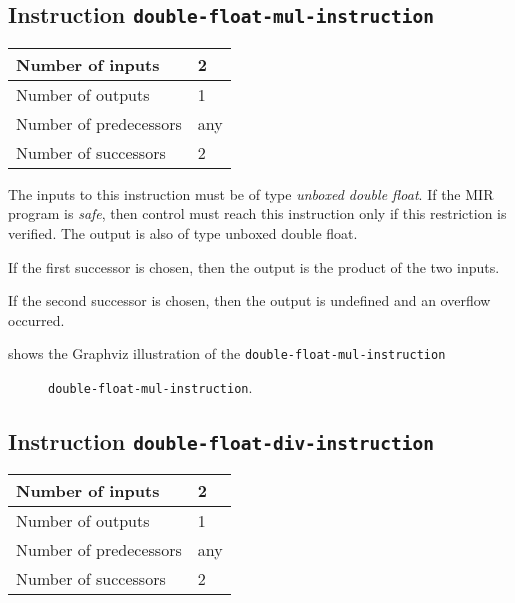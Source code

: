 \subsection{Instruction \texttt{double-float-mul-instruction}}
\label{mir-instruction-double-float-mul}

\begin{tabular}{|l|l|}
\hline
Number of inputs & 2\\
\hline
Number of outputs & 1\\
\hline
Number of predecessors & any\\
\hline
Number of successors & 2\\
\hline
\end{tabular}

The inputs to this instruction must be of type \emph{unboxed double
  float}.  If the MIR program is \emph{safe}, then control must reach
this instruction only if this restriction is verified.  The output is
also of type unboxed double float.

If the first successor is chosen, then the output is
the product of the two inputs.  

If the second successor is chosen, then the output is undefined and an
overflow occurred. 

 shows the Graphviz illustration of the
\texttt{double-float-mul-instruction}

\begin{figure}
\begin{center}
\end{center}
\caption{\label{fig-double-float-mul-instruction}
\texttt{double-float-mul-instruction}.}
\end{figure}

\subsection{Instruction \texttt{double-float-div-instruction}}
\label{mir-instruction-double-float-div}

\begin{tabular}{|l|l|}
\hline
Number of inputs & 2\\
\hline
Number of outputs & 1\\
\hline
Number of predecessors & any\\
\hline
Number of successors & 2\\
\hline
\end{tabular}

